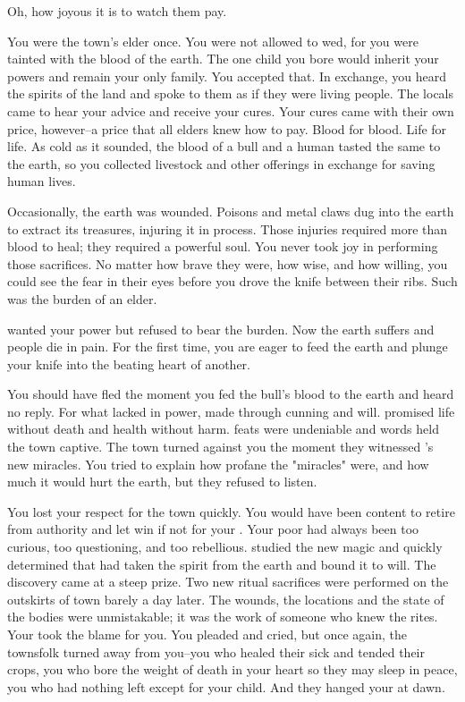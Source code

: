 \documentclass[char]{Pestilence}
\begin{document}
\name{\cShaman{}}

Oh, how joyous it is to watch them pay.

You were the town's elder once. You were not allowed to wed, for you were tainted with the blood of the earth. The one child you bore would inherit your powers and remain your only family. You accepted that. In exchange, you heard the spirits of the land and spoke to them as if they were living people. The locals came to hear your advice and receive your cures. Your cures came with their own price, however--a price that all elders knew how to pay. Blood for blood. Life for life. As cold as it sounded, the blood of a bull and a human tasted the same to the earth, so you collected livestock and other offerings in exchange for saving human lives. 

Occasionally, the earth was wounded. Poisons and metal claws dug into the earth to extract its treasures, injuring it in process. Those injuries required more than blood to heal; they required a powerful soul. You never took joy in performing those sacrifices. No matter how brave they were, how wise, and how willing, you could see the fear in their eyes before you drove the knife between their ribs. Such was the burden of an elder. 

\cElder{\intro} wanted your power but refused to bear the burden. Now the earth suffers and \cElder{\their} people die in pain. For the first time, you are eager to feed the earth and plunge your knife into the beating heart of another.

You should have fled the moment you fed the bull's blood to the earth and heard no reply. For what \cElder{\they} lacked in power, \cElder{} made through cunning and will. \cElder{} promised life without death and health without harm. \cElder{\Their} feats were undeniable and \cElder{\their} words held the town captive. The town turned against you the moment they witnessed \cElder{}'s new miracles. You tried to explain how profane the "miracles" were, and how much it would hurt the earth, but they refused to listen. 

You lost your respect for the town quickly. You would have been content to retire from authority and let \cElder{} win if not for your \cPlaguebearer{\offspring}. Your poor \cPlaguebearer{} had always been too curious, too questioning, and too rebellious. \cPlaguebearer{\They} studied the new magic and quickly determined that \cElder{} had taken the spirit from the earth and bound it to \cElder{\their} will. The discovery came at a steep prize. Two new ritual sacrifices were performed on the outskirts of town barely a day later. The wounds, the locations and the state of the bodies were unmistakable; it was the work of someone who knew the rites. Your \cPlaguebearer{\offspring} took the blame for you. You pleaded and cried, but once again, the townsfolk turned away from you--you who healed their sick and tended their crops, you who bore the weight of death in your heart so they may sleep in peace, you who had nothing left except for your child. And they hanged your \cPlaguebearer{} at dawn.
\end{document}
